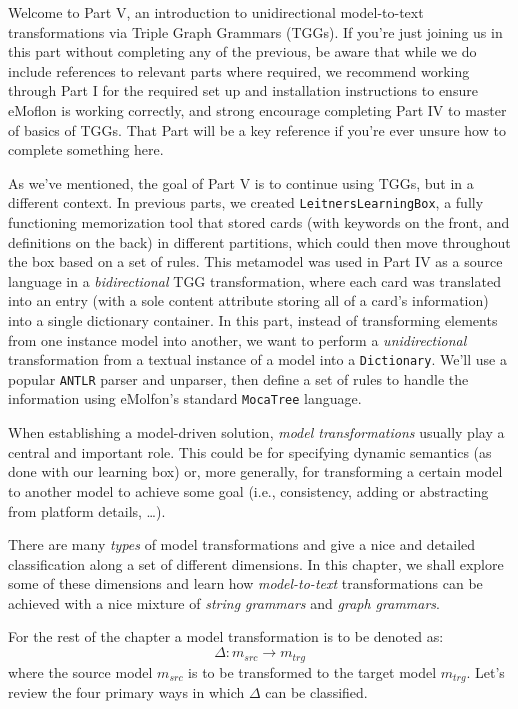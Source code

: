 \genHeader

Welcome to Part V, an introduction to unidirectional model-to-text transformations via Triple Graph Grammars (TGGs). If you're just joining us in this part
without completing any of the previous, be aware that while we do include references to relevant parts where required, we recommend working through
Part I for the required set up and installation instructions to ensure eMoflon is working correctly, and strong encourage completing Part IV to master
of basics of TGGs. That Part will be a key reference if you're ever unsure how to complete something here.

As we've mentioned, the goal of Part V is to continue using TGGs, but in a different context. In previous parts, we created \texttt{LeitnersLearningBox}, a
fully functioning memorization tool that stored cards (with keywords on the front, and definitions on the back) in different partitions, which could then move
throughout the box based on a set of rules. This metamodel was used in Part IV as a source language in a \emph{bidirectional} TGG transformation, where
each card was translated into an entry (with a sole content attribute storing all of a card's information) into a single dictionary container. In this part,
instead of transforming elements from one instance model into another, we want to perform a \emph{unidirectional} transformation from a textual instance of a
model into a \texttt{Dictionary}. We'll use a popular \texttt{ANTLR} parser and unparser, then define a set of rules to handle the information using eMolfon's
standard \texttt{MocaTree} language.

When establishing a model-driven solution, \emph{model transformations} usually play a central and important role. This could be
for specifying dynamic semantics (as done with our learning box) or, more generally, for transforming a certain model to another model to achieve some goal
(i.e., consistency, adding or abstracting from platform details, \ldots).

There are many \emph{types} of model transformations and \cite{CH03,Mens_Gorp_2006} give a nice and detailed classification along a set of different
dimensions. In this chapter, we shall explore some of these dimensions and learn how \emph{model-to-text}
transformations can be achieved with a nice mixture of \emph{string grammars} and \emph{graph grammars}.

For the rest of the chapter a model transformation is to be denoted as:
\begin{displaymath}
 	\Delta: m_{src} \rightarrow m_{trg}
\end{displaymath}
where the source model $m_{src}$ is to be transformed to the target model $m_{trg}$. Let's review the four primary ways in which $\Delta$ can be classified.

